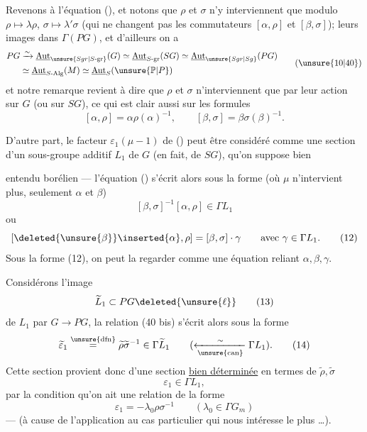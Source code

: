 Revenons à l'équation (), et notons que $\rho$ et $\sigma$ n'y interviennent que modulo  $\rho\mapsto\lambda\rho$, $\sigma\mapsto\lambda'\sigma$  (qui ne changent pas les commutateurs $[\alpha,\rho]$ et $[\beta,\sigma]$);    leurs images dans $\Gamma(PG)$, et d'ailleurs on a
\[
\begin{aligned}
PG&\xrightarrow{\sim}\underline{\mathrm{Aut}}_{\unsure{Sgr|S\text{-gr}}}(G)
\simeq\underline{\mathrm{Aut}}_{S\text{-gr}}(SG)
\simeq\underline{\mathrm{Aut}}_{\unsure{Sgr|Sg}}(PG)\\
&\simeq\underline{\mathrm{Aut}}_{S\text{-Alg}}(M)
\simeq\underline{\mathrm{Aut}}_S(\unsure{\mathbb P|P})
\end{aligned} \tag{\unsure{10|40}}
\]
et notre remarque revient à dire que $\rho$ et $\sigma$ n'interviennent que par leur action sur $G$ (ou sur $SG$), ce qui est clair aussi sur les formules
\[
[\alpha,\rho]=\alpha\rho(\alpha)^{-1},\qquad
[\beta,\sigma]=\beta\sigma(\beta)^{-1}.
\]

D'autre part, le facteur $\varepsilon_1(\mu-1)$ de () peut être considéré comme une section d'un  sous-groupe additif $L_1$ de $G$ (en fait, de $SG$), qu'on suppose bien


entendu borélien --- l'équation () s'écrit alors sous la forme (où $\mu$ n'intervient plus, seulement $\alpha$ et $\beta$)
\[
[\beta,\sigma]^{-1}[\alpha,\rho]\in\Gamma L_1 \tag{11}
\]
ou
\[
[\deleted{\unsure{\beta}}\inserted{\alpha},\rho]=[\beta,\sigma]\cdot\gamma
\qquad\text{avec }\gamma\in\Gamma L_1. \tag{12}
\]
Sous la forme (12), on peut la regarder comme une équation reliant $\alpha,\beta,\gamma$.

Considérons l'image 
\[
\widetilde L_1\subset PG\deleted{\unsure{\ell}} \tag{13}
\]
de $L_1$ par $G\longrightarrow PG$, la relation (40 bis) s'écrit alors sous la forme
\[
\widetilde\varepsilon_1\overset{\unsure{\mathrm{dfn}}}{=}
\widetilde\rho\widetilde\sigma^{-1}\in\Gamma\widetilde L_1
\qquad(\xleftarrow[\unsure{\mathrm{can}}]{\sim}\Gamma L_1). \tag{14}
\]
Cette section provient donc d'une section \uline{bien déterminée}  en termes de $\widetilde\rho,\widetilde\sigma$
\[
\varepsilon_1\in\Gamma L_1, \tag{15}
\]
 par la condition qu'on ait une relation de la forme
\[
\varepsilon_1=-\lambda_0\rho\sigma^{-1}
\qquad(\lambda_0\in\Gamma G_m) \tag*{(16) = (40 bis)}
\]
 --- (à cause de l'application au cas particulier qui nous intéresse le plus \ldots).

